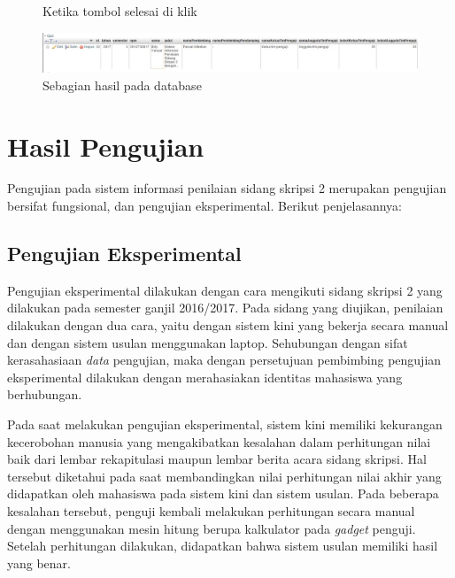 \begin{enumerate}
\begin{figure}[H]
			\caption{Ketika tombol selesai di klik}
			\label{fig:selesaiisi}
		\end{figure}
		\begin{figure}[H]
			\centering
			\includegraphics[scale=0.4]{Gambar/hasildatabase}
			\caption{Sebagian hasil pada database}
			\label{fig:hasildatabase}
		\end{figure}
	\end{enumerate}
	
\section{Hasil Pengujian}
\label{sec:hasilUji}

	Pengujian pada sistem informasi penilaian sidang skripsi 2 merupakan pengujian bersifat fungsional, dan pengujian eksperimental. Berikut penjelasannya:
	
	\subsection{Pengujian Eksperimental}
	\label{sub: PEksperimen}
	
	Pengujian eksperimental dilakukan dengan cara mengikuti sidang skripsi 2 yang dilakukan pada semester ganjil 2016/2017. Pada sidang yang diujikan, penilaian dilakukan dengan dua cara, yaitu dengan sistem kini yang bekerja secara manual dan dengan sistem usulan menggunakan laptop. Sehubungan dengan sifat kerasahasiaan \textit{data} pengujian, maka dengan persetujuan pembimbing pengujian eksperimental dilakukan dengan merahasiakan identitas mahasiswa yang berhubungan.
	
	Pada saat melakukan pengujian eksperimental, sistem kini memiliki kekurangan kecerobohan manusia yang mengakibatkan kesalahan dalam perhitungan nilai baik dari lembar rekapitulasi maupun lembar berita acara sidang skripsi. Hal tersebut diketahui pada saat membandingkan nilai perhitungan nilai akhir yang didapatkan oleh mahasiswa pada sistem kini dan sistem usulan. Pada beberapa kesalahan tersebut, penguji kembali melakukan perhitungan secara manual dengan menggunakan mesin hitung berupa kalkulator pada \textit{gadget} penguji. Setelah perhitungan dilakukan, didapatkan bahwa sistem usulan memiliki hasil yang benar.
	
